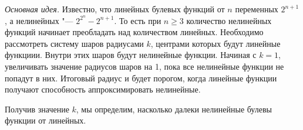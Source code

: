     \emph{Основная идея.}
    Известно, что линейных булевых функций от $n$ переменных $2^{n+1}$, а нелинейных "--- $2^{2^n} - 2^{n+1}$. То есть при $n \geqslant 3$ количество нелинейных функций начинает преобладать над количеством линейных.
    Необходимо рассмотреть систему шаров радиусами $k$, центрами которых будут линейные функциии. Внутри этих шаров будут нелинейные функции. Начиная с $k = 1$, увеличивать значение радиусов шаров на 1, пока все нелинейные функции не попадут в них. Итоговый радиус и будет порогом, когда линейные функции получают способность аппроксимировать нелинейные.
    
    Получив значение $k$, мы определим, насколько далеки нелинейные булевы функции от линейных. 